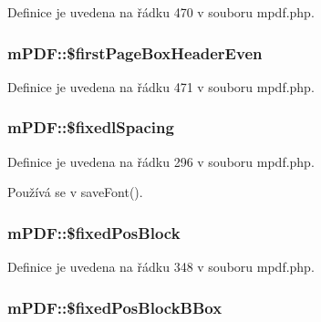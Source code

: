 Definice je uvedena na řádku 470 v souboru mpdf.\-php.

\hypertarget{classm_p_d_f_acf3497b02fce3c55667f3863e9a7acfb}{
\subsubsection[{\$first\-Page\-Box\-Header\-Even}]{\setlength{\rightskip}{0pt plus 5cm}m\-P\-D\-F\-::\$first\-Page\-Box\-Header\-Even}}\label{classm_p_d_f_acf3497b02fce3c55667f3863e9a7acfb}


Definice je uvedena na řádku 471 v souboru mpdf.\-php.

\hypertarget{classm_p_d_f_aab3a17ee1090bb197c3453783d23eb3e}{
\subsubsection[{\$fixedl\-Spacing}]{\setlength{\rightskip}{0pt plus 5cm}m\-P\-D\-F\-::\$fixedl\-Spacing}}\label{classm_p_d_f_aab3a17ee1090bb197c3453783d23eb3e}


Definice je uvedena na řádku 296 v souboru mpdf.\-php.



Používá se v save\-Font().

\hypertarget{classm_p_d_f_a7fd2be45cd0791b525d6254c85c51aa5}{
\subsubsection[{\$fixed\-Pos\-Block}]{\setlength{\rightskip}{0pt plus 5cm}m\-P\-D\-F\-::\$fixed\-Pos\-Block}}\label{classm_p_d_f_a7fd2be45cd0791b525d6254c85c51aa5}


Definice je uvedena na řádku 348 v souboru mpdf.\-php.

\hypertarget{classm_p_d_f_a6e6d982ac950e78e0e113e46bcd06ccd}{
\subsubsection[{\$fixed\-Pos\-Block\-B\-Box}]{\setlength{\rightskip}{0pt plus 5cm}m\-P\-D\-F\-::\$fixed\-Pos\-Block\-B\-Box}}\label{classm_p_d_f_a6e6d982ac950e78e0e113e46bcd06ccd}


